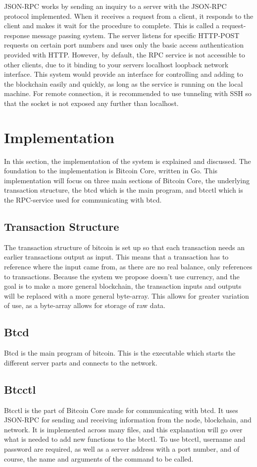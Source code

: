 \documentclass[11pt]{article}
\begin{document}
JSON-RPC works by sending an inquiry to a server with the JSON-RPC protocol implemented. When it receives a request from a client, it responds to the client and makes it wait for the procedure to complete. This is called a request-response message passing system. The server listens for specific HTTP-POST requests on certain port numbers and uses only the basic access authentication provided with HTTP. However, by default, the RPC service is not accessible to other clients, due to it binding to your servers localhost loopback network interface. This system would provide an interface for controlling and adding to the blockchain easily and quickly, as long as the service is running on the local machine. For remote connection, it is recommended to use tunneling with SSH so that the socket is not exposed any further than localhost. 

\section{Implementation}
In this section, the implementation of the system is explained and discussed. The foundation to the implementation is Bitcoin Core, written in Go. This implementation will focus on three main sections of Bitcoin Core, the underlying transaction structure, the btcd which is the main program, and btcctl which is the RPC-service used for communicating with btcd. 

\subsection{Transaction Structure}
The transaction structure of bitcoin is set up so that each transaction needs an earlier transactions output as input. This means that a transaction has to reference where the input came from, as there are no real balance, only references to transactions. Because the system we propose doesn't use currency, and the goal is to make a more general blockchain, the transaction inputs and outputs will be replaced with a more general byte-array. This allows for greater variation of use, as a byte-array allows for storage of raw data. 

\subsection{Btcd}
Btcd is the main program of bitcoin. This is the executable which starts the different server parts and connects to the network. 

\subsection{Btcctl}
Btcctl is the part of Bitcoin Core made for communicating with btcd. It uses JSON-RPC for sending and receiving information from the node, blockchain, and network. It is implemented across many files, and this explanation will go over what is needed to add new functions to the btcctl. To use btcctl, username and password are required, as well as a server address with a port number, and of course, the name and arguments of the command to be called. 
\end{document}
